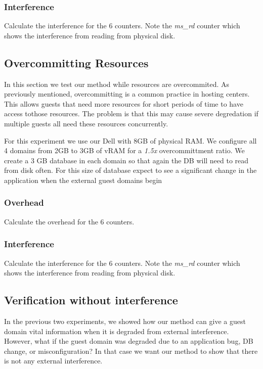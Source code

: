 \subsubsection{Interference}
Calculate the interference for the 6 counters.  Note the \emph{ms\_rd} counter which shows the interference from reading from physical disk.


\subsection{Overcommitting Resources}
In this section we test our method while resources are overcommited.  As previously mentioned, overcommitting is a common practice in hosting centers.  This allows guests that need more resources for short periods of time to have access tothose resources.  The problem is that this may cause severe degredation if multiple guests all need these resources concurrently.  

\indent For this experiment we use our Dell with 8GB of physical RAM.  
We configure all 4 domains from 2GB to 3GB of vRAM for a \emph{1.5x} overcommittment ratio.  We create a 3 GB database in each domain so that again the DB will need to read from disk often.  For this size of database expect to see a significant change in the application when the external guest domains begin 

\subsubsection{Overhead}
Calculate the overhead for the 6 counters.

\subsubsection{Interference}
Calculate the interference for the 6 counters.  Note the \emph{ms\_rd} counter which shows the interference from reading from physical disk.


\subsection{Verification without interference}
In the previous two experiments, we showed how our method can give a guest domain vital information when it is degraded from external interference.  However, what if the guest domain was degraded due to an application bug, DB change, or misconfiguration?   In that case we want our method to show that there is not any external interference.

